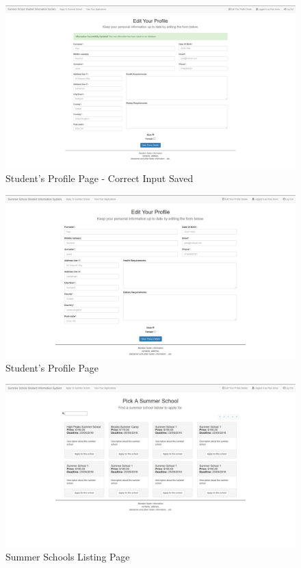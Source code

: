 \documentclass{project}
\begin{document}
\begin{figure}[h]
\includegraphics[width=\linewidth]{profile-edit-correct.png}
\caption{Student's Profile Page - Correct Input Saved}
\label{fig:students-profile-good-input}
\end{figure}
\begin{figure}[h]
\includegraphics[width=\linewidth]{profile-view.png}
\caption{Student's Profile Page}
\label{fig:students-profile}
\end{figure}
\begin{figure}[h]
\includegraphics[width=\linewidth]{schools.png}
\caption{Summer Schools Listing Page}
\label{fig:summer-schools-listing}
\end{figure}
\end{document}
